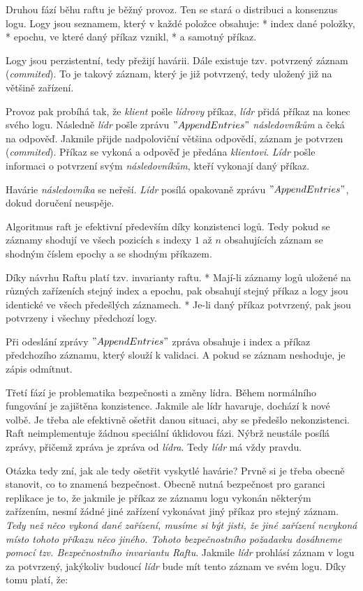 {\sbf Druhou fází běhu raftu je běžný provoz}. Ten se stará o distribuci a konsenzus logu. Logy jsou seznamem, který v každé položce obsahuje:
\begitems
* index dané položky,
* epochu, ve které daný příkaz vznikl,
* a samotný příkaz.

Logy jsou perzistentní, tedy přežijí havárii. Dále existuje tzv. potvrzený záznam ({\em commited}). To je takový záznam, který je již potvrzený, tedy uložený již na většině zařízení.

Provoz pak probíhá tak, že {\em klient} pošle {\em lídrovy} příkaz, {\em lídr} přidá příkaz na konec svého logu. Následně {\em lídr} pošle zprávu $"AppendEntries"$ {\em následovníkům} a čeká na odpověď. Jakmile přijde nadpoloviční většina odpovědí, záznam je potvrzen ({\em commited}). Příkaz se vykoná a odpověď je předána {\em klientovi}. {\em Lídr} pošle informaci o potvrzení svým {\em následovníkům}, kteří vykonají daný příkaz.

Havárie {\em následovníka} se neřeší. {\em Lídr} posílá opakovaně zprávu $"AppendEntries"$, dokud doručení neuspěje.

Algoritmus raft je efektivní především díky konzistenci logů. Tedy pokud se záznamy shodují ve všech pozicích s indexy $1$ až $n$ obsahujících záznam se shodným číslem epochy a se shodným příkazem.

Díky návrhu Raftu platí tzv. {\sbf invarianty raftu}.
\begitems
* Mají-li záznamy logů uložené na různých zařízeních stejný index a epochu, pak obsahují stejný příkaz a logy jsou identické ve všech předešlých záznamech.
* Je-li daný příkaz potvrzený, pak jsou potvrzeny i všechny předchozí logy.
\enditems

Při odeslání zprávy $"AppendEntries"$ zpráva obsahuje i index a příkaz předchozího záznamu, který slouží k validaci. A pokud se záznam neshoduje, je zápis odmítnut.

{\sbf Třetí fází je problematika bezpečnosti a změny lídra}. Během normálního fungování je zajištěna konzistence. Jakmile ale lídr havaruje, dochází k nové volbě. Je třeba ale efektivně ošetřit danou situaci, aby se předešlo nekonzistenci. Raft neimplementuje žádnou speciální úklidovou fázi. Nýbrž neustále posílá zprávy, přičemž zpráva je zpráva od {\em lídra}. Tedy {\em lídr} má vždy pravdu.

Otázka tedy zní, jak ale tedy ošetřit vyskytlé havárie? Prvně si je třeba obecně stanovit, co to znamená {\sbf bezpečnost}. Obecně nutná bezpečnost pro garanci replikace je to, že jakmile je příkaz ze záznamu logu vykonán některým zařízením, nesmí žádné jiné zařízení vykonávat jiný příkaz pro stejný záznam. {\em Tedy než něco vykoná dané zařízení, musíme si být jisti, že jiné zařízení nevykoná místo tohoto příkazu něco jiného. Tohoto bezpečnostního požadavku dosáhneme pomocí tzv. {\sbf Bezpečnostního invariantu Raftu}}. Jakmile {\em lídr} prohlásí záznam v logu za potvrzený, jakýkoliv budoucí {\em lídr} bude mít tento záznam ve svém logu. Díky tomu platí, že:

